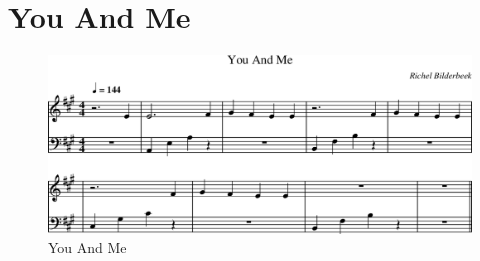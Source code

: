 \chapter{You And Me}



\begin{figure}[!htbp]
  \includegraphics[width=\textwidth,height=\textheight,keepaspectratio]{../songs/41_you_and_me.png}
  \caption{You And Me}
  \label{fig:41_you_and_me}
\end{figure}
